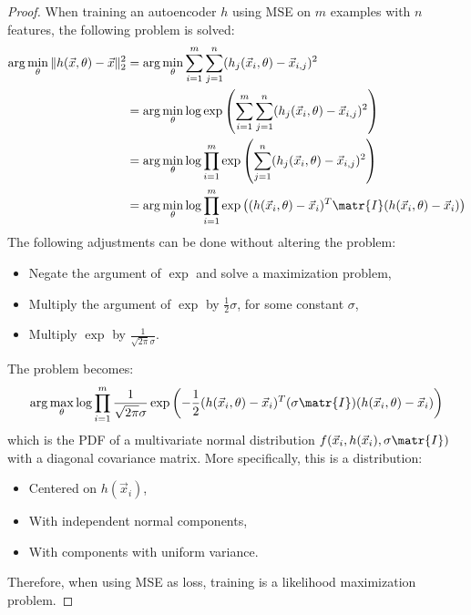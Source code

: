 \begin{theorem}
    \begin{proof}
        When training an autoencoder $h$ using MSE on $m$ examples with $n$ features, the following problem is solved:
        \[ 
            \begin{split}
                \arg\min_{\theta} \Vert h(\vec{x}, \theta) - \vec{x} \Vert_2^2 
                    &= \arg\min_{\theta} \sum_{i=1}^{m} \sum_{j=1}^{n} (h_j(\vec{x}_i, \theta) - \vec{x}_{i,j})^2 \\
                    &= \arg\min_{\theta} \log\exp \left( \sum_{i=1}^{m} \sum_{j=1}^{n} (h_j(\vec{x}_i, \theta) - \vec{x}_{i,j})^2 \right) \\
                    &= \arg\min_{\theta} \log \prod_{i=1}^{m} \exp \left( \sum_{j=1}^{n} (h_j(\vec{x}_i, \theta) - \vec{x}_{i,j})^2 \right) \\
                    &= \arg\min_{\theta} \log \prod_{i=1}^{m} \exp \left( (h(\vec{x}_i, \theta) - \vec{x}_{i})^T \matr{I} (h(\vec{x}_i, \theta) - \vec{x}_{i}) \right)
            \end{split}
        \]
        The following adjustments can be done without altering the problem:
        \begin{itemize}
            \item Negate the argument of $\exp$ and solve a maximization problem,
            \item Multiply the argument of $\exp$ by $\frac{1}{2}\sigma$, for some constant $\sigma$,
            \item Multiply $\exp$ by $\frac{1}{\sqrt{2\pi}\sigma}$.
        \end{itemize}
        The problem becomes:
        \[ \arg\max_{\theta} \log \prod_{i=1}^{m} \frac{1}{\sqrt{2\pi}\sigma} \exp \left( -\frac{1}{2} (h(\vec{x}_i, \theta) - \vec{x}_{i})^T (\sigma\matr{I}) (h(\vec{x}_i, \theta) - \vec{x}_{i}) \right) \]
        which is the PDF of a multivariate normal distribution $f(\vec{x}_i, h(\vec{x}_i), \sigma\matr{I})$ with a diagonal covariance matrix. More specifically, this is a distribution:
        \begin{itemize}
            \item Centered on $h(\vec{x}_i)$,
            \item With independent normal components,
            \item With components with uniform variance.
        \end{itemize}

        Therefore, when using MSE as loss, training is a likelihood maximization problem.
    \end{proof}
\end{theorem}


